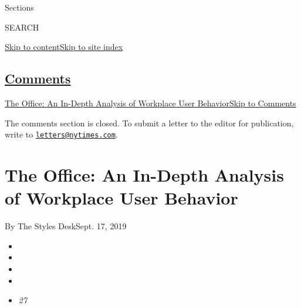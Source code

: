 Sections

SEARCH

\protect\hyperlink{site-content}{Skip to
content}\protect\hyperlink{site-index}{Skip to site index}

\hypertarget{comments}{%
\subsection{\texorpdfstring{\protect\hyperlink{commentsContainer}{Comments}}{Comments}}\label{comments}}

\href{}{The Office: An In-Depth Analysis of Workplace User
Behavior}\href{}{Skip to Comments}

The comments section is closed. To submit a letter to the editor for
publication, write to
\href{mailto:letters@nytimes.com}{\nolinkurl{letters@nytimes.com}}.

\hypertarget{the-office-an-in-depth-analysis-of-workplace-user-behavior}{%
\section{The Office: An In-Depth Analysis of Workplace User
Behavior}\label{the-office-an-in-depth-analysis-of-workplace-user-behavior}}

By The Styles DeskSept. 17, 2019

\begin{itemize}
\item
\item
\item
\item
\item
  \emph{27}
\end{itemize}


